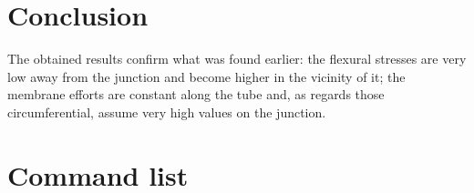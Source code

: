 \section{Conclusion}
The obtained results confirm what was found earlier: the flexural stresses are very low away from the junction and become higher in the vicinity of it; the membrane efforts are constant along the tube and, as regards those circumferential, assume very high values on the junction.
\section{Command list}
\begin{multicols}{2}
\tiny

\normalsize
\end{multicols}